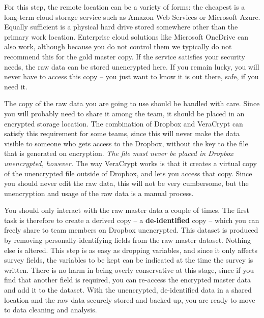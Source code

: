 For this step, the remote location can be a variety of forms:
the cheapest is a long-term cloud storage service
such as Amazon Web Services or Microsoft Azure.
Equally sufficient is a physical hard drive
stored somewhere other than the primary work location.
Enterprise cloud solutions like Microsoft OneDrive
can also work, although because you do not control them
we typically do not recommend this for the gold master copy.
If the service satisfies your security needs,
the raw data can be stored unencrypted here.
If you remain lucky, you will never have to access this copy --
you just want to know it is out there, safe, if you need it.

The copy of the raw data you are going to use
should be handled with care.
Since you will probably need to share it among the team,
it should be placed in an encrypted storage location.
The combination of Dropbox and VeraCrypt
can satisfy this requirement for some teams,
since this will never make the data visible to someone
who gets access to the Dropbox,
without the key to the file that is generated on encryption.
\textit{The file must never be placed in Dropbox unencrypted, however.}
The way VeraCrypt works is that it creates a virtual copy
of the unencrypted file outside of Dropbox, and lets you access that copy.
Since you should never edit the raw data, this will not be very cumbersome,
but the unencryption and usage of the raw data is a manual process.

You should only interact with the raw master data a couple of times.
The first task is therefore to create a derived copy --
a \textbf{de-identified} copy --
which you can freely share to team members on Dropbox unencrypted.
This dataset is produced by removing personally-identifying fields
from the raw master dataset. Nothing else is altered.
This step is as easy as dropping variables,
and since it only affects survey fields,
the variables to be kept can be indicated at the time the survey is written.
There is no harm in being overly conservative at this stage,
since if you find that another field is required,
you can re-access the encrypted master data and add it to the dataset.
With the unencrypted, de-identified data in a shared location
and the raw data securely stored and backed up,
you are ready to move to data cleaning and analysis.
